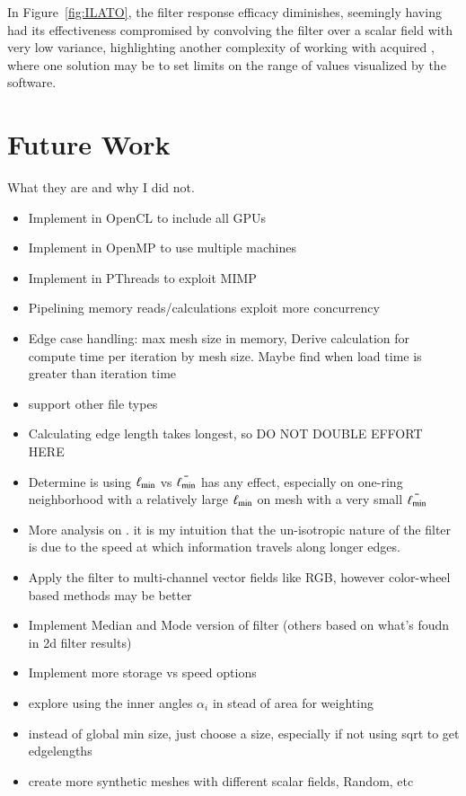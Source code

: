 In Figure~\ref{fig:ILATO}, the filter response efficacy diminishes,  seemingly having had its effectiveness compromised by convolving the filter over a scalar field with very low variance, highlighting another complexity of working with acquired \tdd{}, where one solution may be to set limits on the range of values visualized by the software.


%
%
%
%
%
%
\section{Future Work}
What they are and why I did not.
\begin{itemize}
	\item Implement in OpenCL to include all GPUs
	\item Implement in OpenMP to use multiple machines
	\item Implement in PThreads to exploit MIMP
	\item Pipelining memory reads/calculations exploit more concurrency
	\item Edge case handling: max mesh size in memory, Derive calculation for compute time per iteration by mesh size. Maybe find when load time is greater than iteration time
	\item support other file types
	\item Calculating edge length takes longest, so DO NOT DOUBLE EFFORT HERE
	\item Determine is using $\ell_\text{min}$ vs $\bar{\ell_\text{min}}$ has any effect, especially on one-ring neighborhood with a relatively large $\ell_\text{min}$ on mesh with a very small $\bar{\ell_\text{min}}$
	\item More analysis on \fors. it is my intuition that the un-isotropic nature of the filter is due to the speed at which information travels along longer edges.
	\item Apply the filter to multi-channel vector fields like RGB, however color-wheel based methods may be better
	\item Implement Median and Mode version of filter (others based on what's foudn in 2d filter results)
	\item Implement more storage vs speed options
	\item explore using the inner angles $\alpha_i$ in stead of area for weighting
	\item instead of global min size, just choose a size, especially if not using sqrt to get edgelengths
	\item create more synthetic meshes with different scalar fields, Random, etc

\end{itemize}
